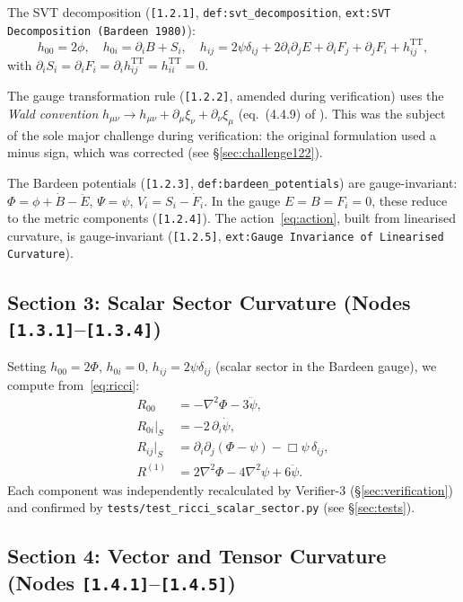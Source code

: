 \documentclass[11pt,a4paper]{article}
\newcommand{\p}{\partial}
\newcommand{\lap}{\nabla^2}
\newcommand{\dbox}{\Box}
\newcommand{\TT}{\mathrm{TT}}
\newcommand{\afnode}[1]{\texttt{[#1]}}
\newcommand{\aftest}[1]{\texttt{tests/#1}}
\newcommand{\afdef}[1]{\texttt{def:#1}}
\newcommand{\afext}[1]{\texttt{ext:#1}}
\begin{document}
The SVT decomposition (\afnode{1.2.1}, \afdef{svt\_decomposition},
\afext{SVT Decomposition (Bardeen 1980)}):
\begin{equation}
h_{00} = 2\phi,\quad
h_{0i} = \p_i B + S_i,\quad
h_{ij} = 2\psi\delta_{ij} + 2\p_i\p_j E + \p_i F_j + \p_j F_i + h^{\TT}_{ij},
\end{equation}
with $\p_i S_i = \p_i F_i = \p_i h^{\TT}_{ij} = h^{\TT}_{ii} = 0$.

The gauge transformation rule (\afnode{1.2.2}, amended during verification)
uses the \emph{Wald convention} $h_{\mu\nu} \to h_{\mu\nu} + \p_\mu\xi_\nu + \p_\nu\xi_\mu$
(eq.~(4.4.9) of \cite{Wald84}). This was the subject of the sole major
challenge during verification: the original formulation used a minus sign,
which was corrected (see \S\ref{sec:challenge122}).

The Bardeen potentials (\afnode{1.2.3}, \afdef{bardeen\_potentials}) are gauge-invariant:
$\Phi = \phi + \dot{B} - \ddot{E}$, $\Psi = \psi$, $V_i = S_i - \dot{F}_i$.
In the gauge $E = B = F_i = 0$, these reduce to the metric components (\afnode{1.2.4}).
The action~\eqref{eq:action}, built from linearised curvature, is gauge-invariant
(\afnode{1.2.5}, \afext{Gauge Invariance of Linearised Curvature}).

\subsection{Section 3: Scalar Sector Curvature (Nodes \afnode{1.3.1}--\afnode{1.3.4})}

Setting $h_{00} = 2\Phi$, $h_{0i} = 0$, $h_{ij} = 2\psi\delta_{ij}$
(scalar sector in the Bardeen gauge), we compute from~\eqref{eq:ricci}:
\begin{align}
R_{00} &= -\lap\Phi - 3\ddot\psi, \label{eq:R00}\\
R_{0i}\big|_S &= -2\,\p_i\dot\psi, \label{eq:R0i}\\
R_{ij}\big|_S &= \p_i\p_j(\Phi - \psi) - \dbox\psi\,\delta_{ij}, \label{eq:Rij}\\
R^{(1)} &= 2\lap\Phi - 4\lap\psi + 6\ddot\psi. \label{eq:Rscalar}
\end{align}
Each component was independently recalculated by Verifier-3 (\S\ref{sec:verification})
and confirmed by \aftest{test\_ricci\_scalar\_sector.py} (see \S\ref{sec:tests}).

\subsection{Section 4: Vector and Tensor Curvature (Nodes \afnode{1.4.1}--\afnode{1.4.5})}
\end{document}
